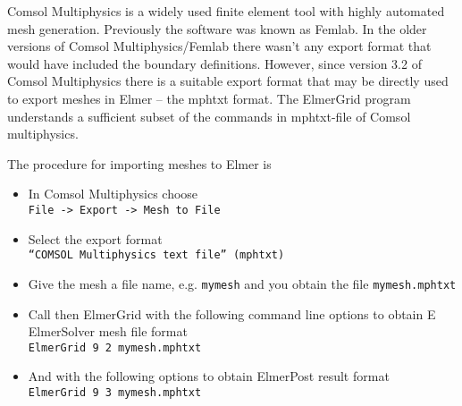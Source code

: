 Comsol Multiphysics is a widely used finite element tool with highly 
automated mesh generation. Previously the software was known as Femlab. 
In the older versions of Comsol Multiphysics/Femlab there 
wasn't any export format that would have included the boundary definitions. 
However, since version 3.2 of Comsol Multiphysics there 
is a suitable export format that may be directly used to export meshes in Elmer 
-- the mphtxt format. 
The ElmerGrid program 
understands a sufficient subset of the commands in mphtxt-file of 
Comsol multiphysics. 



The procedure for importing meshes to Elmer is
\begin{itemize}
  \item In Comsol Multiphysics choose \\
   \texttt{File -> Export -> Mesh to File}
   \item Select the export format \\ \texttt{``COMSOL Multiphysics text file'' (mphtxt)}
   \item Give the mesh a file name, e.g. \texttt{mymesh} and you obtain the 
    file \texttt{mymesh.mphtxt}
  \item Call then ElmerGrid with the following command line options to obtain E
ElmerSolver mesh file format \\
    \texttt{ElmerGrid 9 2 mymesh.mphtxt}
  \item And with the following options to obtain ElmerPost result format \\
    \texttt{ElmerGrid 9 3 mymesh.mphtxt}
\end{itemize}




